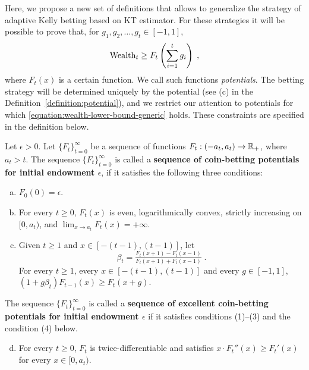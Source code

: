 Here, we propose a new set of definitions that allows to generalize the
strategy of adaptive Kelly betting based on KT estimator. For these strategies it will be
possible to prove that, for $g_1, g_2, \dots, g_t \in [-1,1]$,
\begin{equation}
\label{equation:wealth-lower-bound-generic}
\operatorname{Wealth}_t \ge F_t \left( \sum_{i=1}^t g_i \right) \; ,
\end{equation}
where $F_t(x)$ is a certain function. We call such functions \emph{potentials}.
The betting strategy will be determined uniquely by the potential (see (c) in the Definition~\ref{definition:potential}),
and we restrict our
attention to potentials for which \eqref{equation:wealth-lower-bound-generic}
holds. These constraints are specified in the definition below.
\begin{definition}
\label{definition:potential}
Let $\epsilon > 0$. Let $\{F_t\}_{t=0}^\infty$ be a sequence of functions
$F_t:(-a_t, a_t)  \to \mathbb{R}_+$, where $a_t > t$.  The sequence
$\{F_t\}_{t=0}^\infty$ is called a \textbf{sequence of coin-betting potentials
for initial endowment $\epsilon$}, if it satisfies the following three
conditions:
\begin{enumerate}[(a)]
\item $F_0(0) = \epsilon$.

\item For every $t \ge 0$, $F_t(x)$ is even, logarithmically convex, strictly
increasing on $[0,a_t)$, and
$\lim_{x \to a_t} F_t(x) = +\infty$.
\item Given $t \ge 1$ and $x \in [-(t-1), (t-1)]$, let 
\begin{equation}
\label{equation:potential-based-strategy}
\beta_t=\tfrac{F_t(x + 1) - F_t(x - 1)}{F_t(x + 1) + F_t(x - 1)} \;.
\end{equation}
For every $t \ge 1$, every $x \in [-(t-1), (t-1)]$ and every $g \in [-1,1]$, $\left(1 + g \beta_t \right) F_{t-1}(x) \ge F_t(x+g)$.
\end{enumerate}
The sequence $\{F_t\}_{t=0}^\infty$ is called a
\textbf{sequence of excellent coin-betting potentials for initial
endowment $\epsilon$} if it satisfies conditions (1)--(3) and the condition (4)
below.
\begin{enumerate}[(a)]
\setcounter{enumi}{3}
\item For every $t \ge 0$, $F_t$ is twice-differentiable and
satisfies $x \cdot F_t''(x) \ge F_t'(x)$ for every $x \in [0,a_t)$.
\end{enumerate}
\end{definition}

